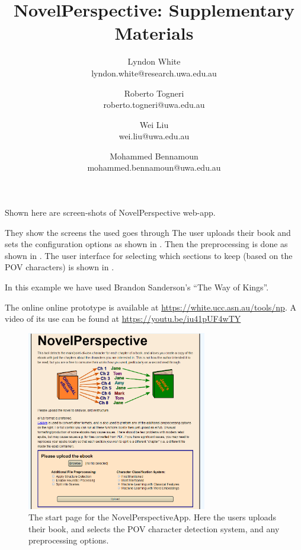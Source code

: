 \documentclass[11pt,a4paper]{article}
\title{NovelPerspective: Supplementary Materials}
\author{Lyndon White \\ lyndon.white@research.uwa.edu.au %
	\and Roberto Togneri \\ roberto.togneri@uwa.edu.au%
	\and Wei Liu \\ wei.liu@uwa.edu.au %
	\and Mohammed Bennamoun \\ mohammed.bennamoun@uwa.edu.au %
}
\begin{document}
\maketitle

Shown here are screen-shots of NovelPerspective web-app.


They show the screens the used goes through
The user uploads their book and sets the configuration options as shown in .
Then the preprocessing is done as shown in .
The user interface for selecting which sections to keep (based on the POV characters)
is shown in .


In this example we have used Brandon Sanderson's ``The Way of Kings''.

The online online prototype is available at \url{https://white.ucc.asn.au/tools/np}.
A video of its use can be found at \url{https://youtu.be/iu41pUF4wTY}



\begin{figure}
	\centering
	\includegraphics[width=0.7\textwidth]{startpage}
	\caption{The start page for the NovelPerspectiveApp. Here the users uploads their book, and selects the POV character detection system, and any preprocessing options.}
	\label{fig:start}
\end{figure}
\end{document}
